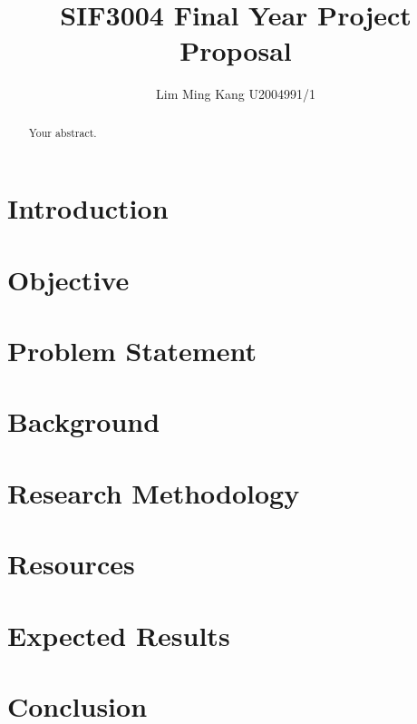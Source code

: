 \documentclass{article}
\title{SIF3004 Final Year Project Proposal}
\author{Lim Ming Kang U2004991/1}
\begin{document}
\maketitle

\begin{abstract}
Your abstract.
\end{abstract}

\section{Introduction}
\section{Objective}
\section{Problem Statement}
\section{Background}
\section{Research Methodology}
\section{Resources}
\section{Expected Results}
\section{Conclusion}



\end{document}
